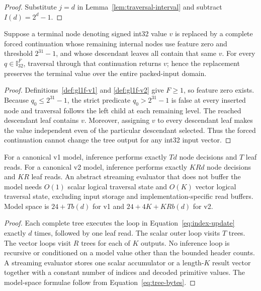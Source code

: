 \begin{proof}
Substitute $j=d$ in Lemma~\ref{lem:traversal-interval} and subtract
$I(d)=2^d-1$.
\end{proof}

\begin{lemma}
\label{lem:forced-subtree}
Suppose a terminal node denoting signed int32 value $v$ is replaced by a
complete forced continuation whose remaining internal nodes use feature zero
and threshold $2^{31}-1$, and whose descendant leaves all contain that same
$v$. For every $q\in\mathbb{I}_{32}^F$, traversal through that continuation
returns $v$; hence the replacement preserves the terminal value over the
entire packed-input domain.
\end{lemma}

\begin{proof}
Definitions~\ref{def:gl1f-v1} and \ref{def:gl1f-v2} give $F\ge1$, so feature
zero exists.  Because
$q_0\le2^{31}-1$, the strict predicate
$q_0>2^{31}-1$ is false at every inserted node and traversal follows the left
child at each remaining level.  The reached descendant leaf contains $v$.
Moreover, assigning $v$ to every descendant leaf makes the value independent
even of the particular descendant selected.  Thus the forced continuation
cannot change the tree output for any int32 input vector.
\end{proof}

\begin{theorem}
\label{thm:complexity}
For a canonical v1 model, inference performs exactly $Td$ node decisions and
$T$ leaf reads.  For a canonical v2 model, inference performs exactly $KRd$
node decisions and $KR$ leaf reads.  An abstract streaming evaluator that
does not buffer the model needs $O(1)$ scalar logical traversal state and
$O(K)$ vector logical traversal state, excluding input storage and
implementation-specific read buffers.  Model space is $24+Tb(d)$ for v1 and
$24+4K+KRb(d)$ for v2.
\end{theorem}

\begin{proof}
Each complete tree executes the loop in Equation~\ref{eq:index-update} exactly
$d$ times, followed by one leaf read.  The scalar outer loop visits $T$ trees.
The vector loops visit $R$ trees for each of $K$ outputs.  No inference loop is
recursive or conditioned on a model value other than the bounded header
counts.  A streaming evaluator stores one scalar accumulator or a length-$K$
result vector together with a constant number of indices and decoded
primitive values.  The model-space formulae follow from
Equation~\ref{eq:tree-bytes}.
\end{proof}

